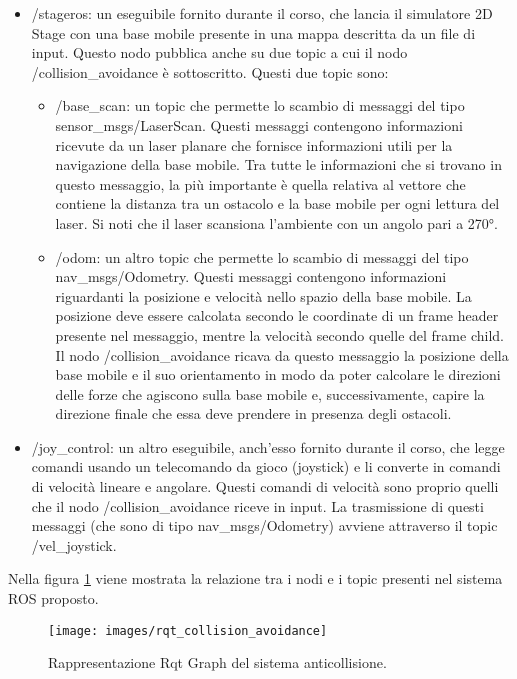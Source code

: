 \begin{itemize}
	\item /stageros: un eseguibile fornito durante il corso, che lancia il simulatore 2D Stage con una base mobile presente in una mappa descritta da un file di input. Questo nodo pubblica anche su due topic a cui il nodo /collision\_avoidance è sottoscritto. Questi due topic sono:
	\begin{itemize}
		\item /base\_scan: un topic che permette lo scambio di messaggi del tipo sensor\_msgs/LaserScan. Questi messaggi contengono informazioni ricevute da un laser planare che fornisce informazioni utili per la navigazione della base mobile. Tra tutte le informazioni che si trovano in questo messaggio, la più importante è quella relativa al vettore che contiene la distanza tra un ostacolo e la base mobile per ogni lettura del laser. Si noti che il laser scansiona l’ambiente con un angolo pari a 270°.
		\item /odom: un altro topic che permette lo scambio di messaggi del tipo nav\_msgs/Odometry. Questi messaggi contengono informazioni riguardanti la posizione e velocità nello spazio della base mobile. La posizione deve essere calcolata secondo le coordinate di un  frame header presente nel messaggio, mentre la velocità secondo quelle del frame child. Il nodo /collision\_avoidance ricava da questo messaggio la posizione della base mobile e il suo orientamento in modo da poter calcolare le direzioni delle forze che agiscono sulla base mobile e, successivamente, capire la direzione finale che essa deve prendere in presenza degli ostacoli.
	\end{itemize}
	
	\item /joy\_control: un altro eseguibile, anch'esso fornito durante il corso, che legge comandi usando un telecomando da gioco (joystick) e li converte in comandi di velocità lineare e angolare. Questi comandi di velocità sono proprio quelli che il nodo /collision\_avoidance riceve in input. La trasmissione di questi messaggi (che sono di tipo nav\_msgs/Odometry) avviene attraverso il topic /vel\_joystick.
\end{itemize}

Nella figura \ref{fig:rqtcollisionavoidance} viene mostrata la relazione tra i nodi e i topic presenti nel sistema ROS proposto.\\

\begin{figure}[h]
	\centering
	\texttt{[image: images/rqt\_collision\_avoidance]}
	\caption{Rappresentazione Rqt Graph del sistema anticollisione.}
	\label{fig:rqtcollisionavoidance}
\end{figure}


